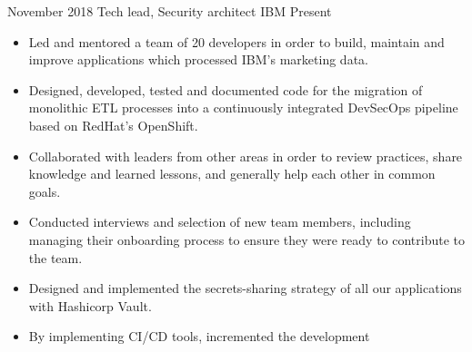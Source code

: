 %
%
%


\begin{experiences}
    \experience
        {November 2018}
        {Tech lead, Security architect}
        {IBM}
        {Present}
        {
            \begin{itemize}
                \item Led and mentored a team of 20 developers in order to build, maintain and improve
                    applications which processed IBM's marketing data.
                \item Designed, developed, tested and documented code for the 
                    migration of monolithic ETL processes into a continuously 
                    integrated DevSecOps pipeline based on RedHat's OpenShift.
                \item Collaborated with leaders from other areas in order to review practices,
                    share knowledge and learned lessons, and generally help each other in common goals.
                \item Conducted interviews and selection of new team members, including managing their
                    onboarding process to ensure they were ready to contribute to the team.
                \item Designed and implemented the secrets-sharing strategy of
                    all our applications with Hashicorp Vault.
                \item By implementing CI/CD tools, incremented the development 

\end{itemize}}
\end{experiences}
